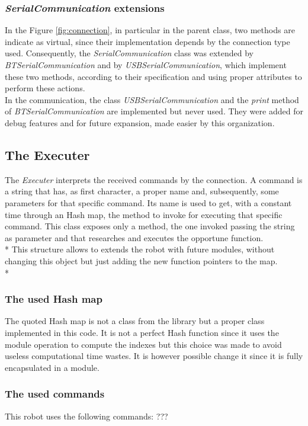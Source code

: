 \subsubsection{\textit{SerialCommunication} extensions}
In the Figure \ref{fig:connection}, in particular in the parent class, two methods are indicate as virtual, since their implementation depends by the connection type used. Consequently, the \textit{SerialCommunication} class was extended by \textit{BTSerialCommunication} and by \textit{USBSerialCommunication}, which implement these two methods, according to their specification and using proper attributes to perform these actions.\\
In the communication, the class \textit{USBSerialCommunication} and the \textit{print} method of \textit{BTSerialCommunication} are implemented but never used. They were added for debug features and for future expansion, made easier by this organization.

\subsection{The Executer}
The \textit{Executer} interprets the received commands by the connection. A command is a string that has, as first character, a proper name and, subsequently, some parameters for that specific command. Its name is used to get, with a constant time through an Hash map, the method to invoke for executing that specific command. This class exposes only a method, the one invoked passing the string as parameter and that researches and executes the opportune function.\\*
This structure allows to extends the robot with future modules, without changing this object but just adding the new function pointers to the map.\\*

\subsubsection{The used Hash map}
The quoted Hash map is not a class from the library but a proper class implemented in this code. It is not a perfect Hash function since it uses the module operation to compute the indexes but this choice was made to avoid useless computational time wastes. It is however possible change it since it is fully encapsulated in a module.\\

\subsubsection{The used commands}
This robot uses the following commands:
???

